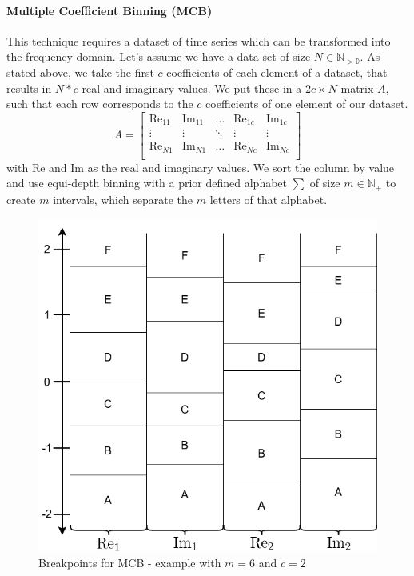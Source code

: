 \paragraph{Multiple Coefficient Binning (MCB)}
This technique requires a dataset of time series which can be transformed into the frequency domain. Let's assume we have a data set of size $N \in \mathbb{N_{>0}}$.
As stated above, we take the first $c$ coefficients of each element of a dataset, that results in $N * c$ real and imaginary values. We put these in a $2c \times N$ matrix $A$, such that each row corresponds to the $c$ coefficients of one element of our dataset.
\begin{equation}
A =
\begin{bmatrix}
	\text{Re}_{11} & \text{Im}_{11} & \dots & \text{Re}_{1c} & \text{Im}_{1c} \\
	\vdots & \vdots & \ddots & \vdots & \vdots \\
	\text{Re}_{N1} & \text{Im}_{N1} & \dots & \text{Re}_{Nc} & \text{Im}_{Nc} \\
\end{bmatrix}
\end{equation}
with Re and Im as the real and imaginary values.
We sort the column by value and use equi-depth binning with a prior defined alphabet $\sum$ of size $m\in\mathbb{N_+}$ to create $m$ intervals, which separate the $m$ letters of that alphabet.
\begin{figure}[ht]
	\centering
	\includegraphics[width=.8\textwidth]{gfx/BOSS_MCB2.PNG}
	\caption{Breakpoints for MCB - example with $m = 6$ and $c = 2$}
	\label{fig:BOSS_MCB}
\end{figure}

